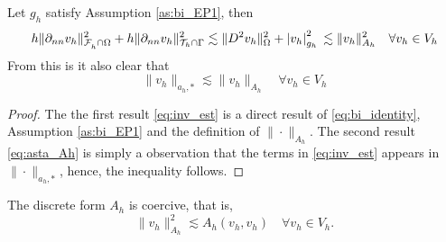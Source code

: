 \begin{corollary}
    \label{cor:bi_inverse_thm}
    Let  $g_{h}$ satisfy Assumption \ref{as:bi_EP1}, then
    \begin{equation}
        \label{eq:inv_est}
            h\| \partial _{nn}  v_{h} \|_{ \mathcal{F}_h^{} \cap \Omega    }^{2 } + h\| \partial _{nn} v_{h} \|_{ \mathcal{T} _{h} \cap \Gamma  }^{2  }   \lesssim  \| D^2 v_{h} \|_{ \Omega  }^{ 2 } + \left\lvert  v_{h}  \right\rvert _{g_{h}}^{2} \\
              \lesssim \| v_{h} \|_{ A_{h} }^{  2} \quad  \forall v_{h} \in V_{h}
    \end{equation}
    From this is it also clear that \begin{equation}
        \label{eq:asta_Ah}
    \| v_{h} \|_{ a_{h},* }^{  }  \lesssim \| v_{h} \|_{ A_{h} }^{  } \quad  \forall v_{h} \in V_{h}
    \end{equation}
\end{corollary}
\begin{proof}
    The the first result \eqref{eq:inv_est} is a direct result of \eqref{eq:bi_identity}, Assumption \ref{as:bi_EP1} and the definition of $\| \cdot  \|_{ A_{h} }^{  } $.
    The second result \eqref{eq:asta_Ah} is simply a observation that the terms in \eqref{eq:inv_est} appears in $\| \cdot   \|_{a_{h},*  }^{  } $, hence, the inequality follows.
\end{proof}

\begin{lemma}
    \label{lemma:bi_Ah_coercive}
    The discrete form $A_{h}$ is coercive, that is, \[
    \| v_{h} \|_{ A_{h} }^{ 2 }  \lesssim A_{h}( v_{h},v_{h})\quad  \forall v_{h} \in V_{h}.
    \]
\end{lemma}

